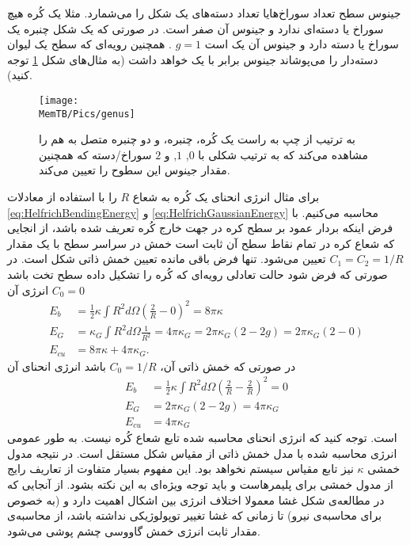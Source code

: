  جینوس سطح تعداد سوراخ‌هایا تعداد دسته‌های یک شکل را می‌شمارد.
مثلا یک کُره هیچ سوراخ یا دسته‌ای ندارد و جینوس آن صفر است. در صورتی که یک شکل چنبره
یک سوراخ یا دسته دارد و جینوس آن یک است
$g=1$
. همچنین رویه‌ای که سطح یک لیوان دسته‌دار را می‌پوشاند جینوس برابر با یک خواهد داشت (به مثال‌های شکل 
\ref{fig:genus012}
توجه کنید).
\begin{figure}[t]
\begin{center}
\texttt{[image: \\MemTB/Pics/genus]}
\caption{
به ترتیب از چپ به راست یک کُره، چنبره، و دو چنبره متصل به هم را مشاهده می‌کند که به ترتیب شکلی با 
$0$, $1$,
 و 
$2$
سوراخ/دسته که همچنین مقدار جینوس این سطوح را تعیین می‌کند.
}
\label{fig:genus012}
\end{center}
\end{figure}
برای مثال انرژی انحنای یک کُره به شعاع
$R$
را با استفاده از معادلات
\ref{eq:HelfrichBendingEnergy}
و
\ref{eq:HelfrichGaussianEnergy}
محاسبه می‌کنیم. با فرض اینکه بردار عمود بر سطح کره در جهت خارج کُره تعریف شده باشد، از انجایی که شعاع‌ کره در تمام نقاط سطح آن ثابت است خمش در سراسر سطح با یک مقدار
$C_1=C_2=1/R$
تعیین می‌شود. تنها فرض باقی مانده تعیین خمش ذاتی شکل است. در صورتی که فرض شود حالت تعادلی رویه‌ای که کُره را تشکیل داده سطح تخت باشد
$C_0=0$
انرژی آن
 \begin{equation}
 \begin{aligned}
E_{b}&=\frac{1}{2}\kappa\int R^2d\Omega (\frac{2}{R}-0)^2=8\pi\kappa\\
E_{G}&=\kappa_G\int R^2d\Omega \frac{1}{R^2}=4\pi\kappa_G=2\pi\kappa_G(2-2g)=2\pi\kappa_G(2-0) \\
E_{cu}&=8\pi\kappa+4\pi\kappa_G.
\end{aligned}
\end{equation}
در صورتی که خمش ذاتی آن،
$C_0=1/R$
باشد انرژی انحنای آن
 \begin{equation}
 \begin{aligned}
E_{b}&=\frac{1}{2}\kappa\int R^2d\Omega (\frac{2}{R}-\frac{2}{R})^2=0\\
E_{G}&=2\pi\kappa_G(2-2g)=4\pi\kappa_G \\
E_{cu}&=4\pi\kappa_G
\end{aligned}
\end{equation}
است. توجه کنید که انرژی انحنای محاسبه شده تابع شعاع کُره نیست. به طور عمومی انرژی محاسبه شده با مدل خمش ذاتی از مقیاس شکل مستقل است. در نتیجه مدول خمشی
$\kappa$
نیز تابع مقیاس سیستم نخواهد بود. این مفهوم بسیار متفاوت از تعاریف رایج از مدول خمشی برای پلیمر‌هاست و باید توجه ویژه‌ای به این نکته بشود. از آنجایی که در مطالعه‌ی شکل غشا معمولا اختلاف انرژی بین اشکال اهمیت دارد و (به خصوص برای محاسبه‌ی نیرو) تا زمانی که غشا تغییر توپولوژیکی نداشته باشد، از محاسبه‌ی مقدار ثابت انرژی خمش گاووسی چشم پوشی می‌شود. 





































